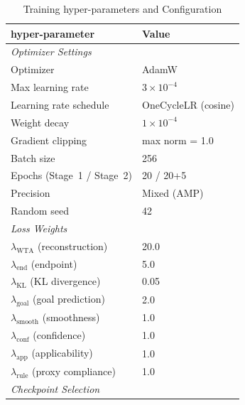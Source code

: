 \begin{table}[t]
\centering
\caption{Training hyper-parameters and Configuration}
\label{tab:training_config}
\begin{tabular}{ll}
\toprule
\textbf{hyper-parameter} & \textbf{Value} \\
\midrule
\multicolumn{2}{l}{\textit{Optimizer Settings}} \\
Optimizer & AdamW \\
Max learning rate & $3 \times 10^{-4}$ \\
Learning rate schedule & OneCycleLR (cosine) \\
Weight decay & $1 \times 10^{-4}$ \\
Gradient clipping & max norm = 1.0 \\
Batch size & 256 \\
Epochs (Stage~1 / Stage~2) & 20 / 20+5 \\
Precision & Mixed (AMP) \\
Random seed & 42 \\
\midrule
\multicolumn{2}{l}{\textit{Loss Weights}} \\
$\lambda_{\text{WTA}}$ (reconstruction) & 20.0 \\
$\lambda_{\text{end}}$ (endpoint) & 5.0 \\
$\lambda_{\text{KL}}$ (KL divergence) & 0.05 \\
$\lambda_{\text{goal}}$ (goal prediction) & 2.0 \\
$\lambda_{\text{smooth}}$ (smoothness) & 1.0 \\
$\lambda_{\text{conf}}$ (confidence) & 1.0 \\
$\lambda_{\text{app}}$ (applicability) & 1.0 \\
$\lambda_{\text{rule}}$ (proxy compliance) & 1.0 \\
\midrule
\multicolumn{2}{l}{\textit{Checkpoint Selection}} \\


\end{tabular}
\end{table}
